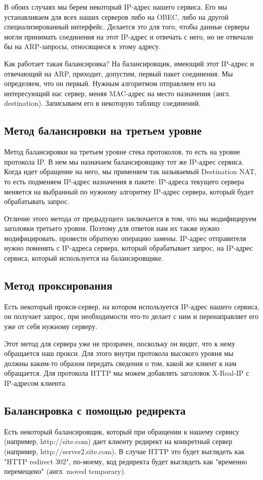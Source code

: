 В обоих случаях мы берем некоторый IP-адрес нашего сервиса. Его мы устанавливаем для всех наших серверов либо на OBEC, либо на другой специализированный интерфейс. Делается это для того, чтобы данные серверы могли принимать соединения на этот IP-адрес и отвечать с него, но не отвечали бы на ARP-запросы, относящиеся к этому адресу.

Как работает такая балансировка? На балансировщик, имеющий этот IP-адрес и отвечающий на ARP, приходит, допустим, первый пакет соединения. Мы определяем, что он первый. Нужным алгоритмом отправляем его на интересующий нас сервер, меняя MAC-адрес на место назначения (англ. destination). Записываем его в некоторую таблицу соединений.

\subsection{Метод балансировки на третьем уровне}
Метод балансировки на третьем уровне стека протоколов, то есть на уровне протокола IP. В нем мы назначаем балансировщику тот же IP-адрес сервиса. Когда идет обращение на него, мы применяем так называемый Destination NAT, то есть подменяем IP-адрес назначения в пакете: IP-адреса текущего сервера меняется на выбранный по нужному алгоритму IP-адрес сервера, который будет обрабатывать запрос.

Отличие этого метода от предыдущего заключается в том, что мы модифицируем заголовки третьего уровня. Поэтому для ответов нам их также нужно модифицировать, провести обратную операцию замены. IP-адрес отправителя нужно поменять с IP-адреса сервера, который обрабатывает запрос, на IP-адрес сервиса, который используется на балансировщике.

\subsection{Метод проксирования}

Есть некоторый прокси-сервер, на котором используется IP-адрес нашего сервиса, он получает запрос, при необходимости что-то делает с ним и перенаправляет его уже от себя нужному серверу.

Этот метод для сервера уже не прозрачен, поскольку он видит, что к нему обращается наш прокси. Для этого внутри протокола высокого уровня мы должны каким-то образом передать сведения о том, какой же клиент к нам обращается. Для протокола HTTP мы можем добавлять заголовок X-Real-IP с IP-адресом клиента.

\subsection{Балансировка с помощью редиректа}
Есть некоторый балансировщик, который при обращении к нашему сервису (например, http://site.com) дает клиенту редирект на конкретный сервер (например, http://server2.site.com). В случае HTTP это будет выглядеть как "HTTP redirect 302", по-моему, код редиректа будет выглядеть как "временно перемещено" (англ. moved temporary).

